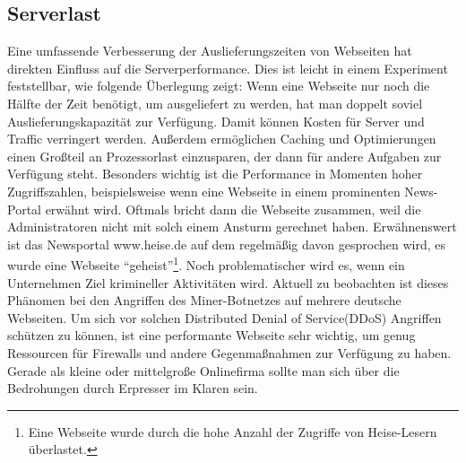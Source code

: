 \subsection{Serverlast}
Eine umfassende Verbesserung der Auslieferungszeiten von Webseiten hat direkten Einfluss auf die Serverperformance. Dies ist leicht in einem Experiment feststellbar, wie folgende Überlegung zeigt: Wenn eine Webseite nur noch die Hälfte der Zeit benötigt, um ausgeliefert zu werden, hat man doppelt soviel Auslieferungskapazität zur Verfügung. Damit k\"onnen Kosten für Server und Traffic verringert werden. Außerdem ermöglichen Caching und Optimierungen einen Großteil an Prozessorlast einzusparen, der dann für andere Aufgaben zur Verfügung steht. Besonders wichtig ist die Performance in Momenten hoher Zugriffszahlen, beispielsweise wenn eine Webseite in einem prominenten News-Portal erwähnt wird. Oftmals bricht dann die Webseite zusammen, weil die Administratoren nicht mit solch einem Ansturm gerechnet haben. Erwähnenswert ist das Newsportal www.heise.de auf dem regelmäßig davon gesprochen wird, es wurde eine Webseite "`geheist"'\footnote{Eine Webseite wurde durch die hohe Anzahl der Zugriffe von Heise-Lesern \"uberlastet.}. Noch problematischer wird es, wenn ein Unternehmen Ziel krimineller Aktivitäten wird. Aktuell zu beobachten ist dieses Phänomen bei den Angriffen des Miner-Botnetzes auf mehrere deutsche Webseiten.\citep{Kaspersky2011} Um sich vor solchen Distributed Denial of Service(DDoS) Angriffen schützen zu können, ist eine performante Webseite sehr wichtig, um genug Ressourcen für Firewalls und andere Gegenmaßnahmen zur Verfügung zu haben. Gerade als kleine oder mittelgro\ss{}e Onlinefirma sollte man sich \"uber die Bedrohungen durch Erpresser im Klaren sein.


